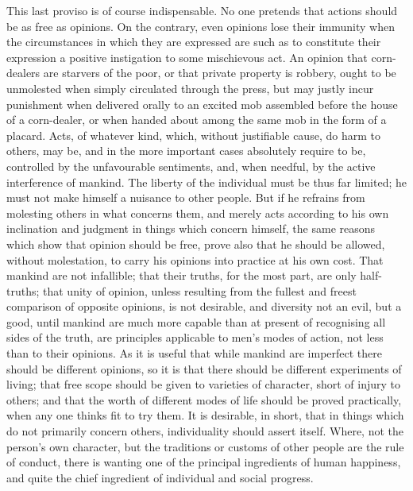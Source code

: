 \documentclass[11pt,openany]{book}
\begin{document}
This last proviso is of course indispensable. No one pretends that actions should be as free as opinions. On the contrary, even opinions lose their immunity when the circumstances in which they are expressed are such as to constitute their expression a positive instigation to some mischievous act. An opinion that corn-dealers are starvers of the poor, or that private property is robbery, ought to be unmolested when simply circulated through the press, but may justly incur punishment when delivered orally to an excited mob assembled before the house of a corn-dealer, or when handed about among the same mob in the form of a placard. Acts, of whatever kind, which, without justifiable cause, do harm to others, may be, and in the more important cases absolutely require to be, controlled by the unfavourable sentiments, and, when needful, by the active interference of mankind. The liberty of the individual must be thus far limited; he must not make himself a nuisance to other people. But if he refrains from molesting others in what concerns them, and merely acts according to his own inclination and judgment in things which concern himself, the same reasons which show that opinion should be free, prove also that he should be allowed, without molestation, to carry his opinions into practice at his own cost. That mankind are not infallible; that their truths, for the most part, are only half-truths; that unity of opinion, unless resulting from the fullest and freest comparison of opposite opinions, is not desirable, and diversity not an evil, but a good, until mankind are much more capable than at present of recognising all sides of the truth, are principles applicable to men's modes of action, not less than to their opinions. As it is useful that while mankind are imperfect there should be different opinions, so it is that there should be different experiments of living; that free scope should be given to varieties of character, short of injury to others; and that the worth of different modes of life should be proved practically, when any one thinks fit to try them. It is desirable, in short, that in things which do not primarily concern others, individuality should assert itself. Where, not the person's own character, but the traditions or customs of other people are the rule of conduct, there is wanting one of the principal ingredients of human happiness, and quite the chief ingredient of individual and social progress.
\end{document}
